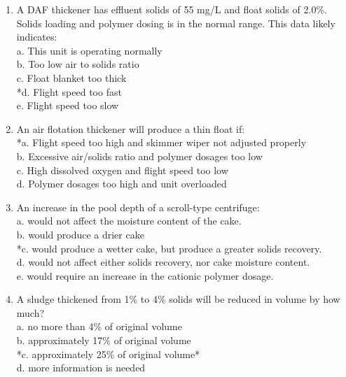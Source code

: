 \documentclass{article}
\begin{document}
\begin{enumerate}
\item  A DAF thickener has effluent solids of 55 mg/L and float solids of 2.0\%. Solids loading and polymer dosing is in the normal range. This data likely indicates: \\

a. This unit is operating normally \\
b. Too low air to solids ratio \\
c. Float blanket too thick \\
*d. Flight speed too fast \\
e. Flight speed too slow \\

\item  An air flotation thickener will produce a thin float if: \\

*a. Flight speed too high and skimmer wiper not adjusted properly \\
b. Excessive air/solids ratio and polymer dosages too low \\
c. High dissolved oxygen and flight speed too low \\
d. Polymer dosages too high and unit overloaded \\

\item  An increase in the pool depth of a scroll-type centrifuge: \\

a. would not affect the moisture content of the cake. \\
b. would produce a drier cake \\
*c. would produce a wetter cake, but produce a greater solids recovery. \\
d. would not affect either solids recovery, nor cake moisture content. \\
e. would require an increase in the cationic polymer dosage. \\

\item  A sludge thickened from 1\% to 4\% solids will be reduced in volume by how much? \\

a. no more than 4\% of original volume \\
b. approximately 17\% of original volume \\
*c. approximately 25\% of original volume* \\
d. more information is needed \\


\end{enumerate}
\end{document}
